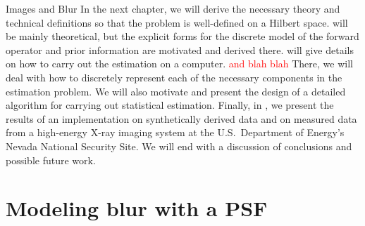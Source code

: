 \begin{chapter}{Images and Blur}
  In the next chapter, we will derive the necessary theory and technical definitions so that the problem is well-defined on a Hilbert space.
   will be mainly theoretical, but the explicit forms for the discrete model of the forward operator and prior information are motivated and derived there.
   will give details on how to carry out the estimation on a computer.
  \textcolor{red}{and blah blah}
  There, we will deal with how to discretely represent each of the necessary components in the estimation problem.
  We will also motivate and present the design of a detailed algorithm for carrying out statistical estimation.
  Finally, in , we present the results of an implementation on synthetically derived data and on measured data from a high-energy X-ray imaging system at the U.S.~Department of Energy's Nevada National Security Site.
  We will end with a discussion of conclusions and possible future work.


\section{Modeling blur with a PSF}
  

\end{chapter}
